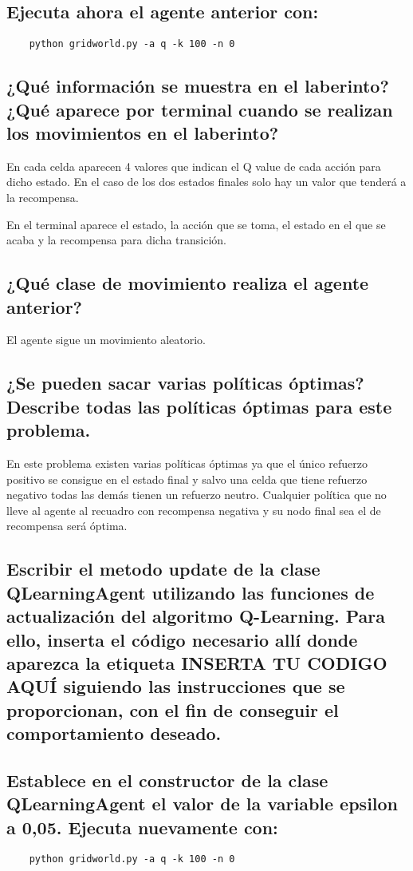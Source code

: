 \documentclass[12pt]{article}
\begin{document}
    \subsection{Ejecuta ahora el agente anterior con:}
    \begin{verbatim}
    python gridworld.py -a q -k 100 -n 0
    \end{verbatim}
    \subsection{¿Qué información se muestra en el laberinto? ¿Qué aparece por terminal cuando se realizan los
    movimientos en el laberinto?}
    En cada celda aparecen 4 valores que indican el Q value de cada acción para dicho estado. En el caso de los dos
    estados finales solo hay un valor que tenderá a la recompensa.

    En el terminal aparece el estado, la acción que se toma, el estado en el que se acaba y la recompensa para dicha
    transición.
    \subsection{¿Qué clase de movimiento realiza el agente anterior?}
    El agente sigue un movimiento aleatorio.
    \subsection{¿Se pueden sacar varias políticas óptimas? Describe todas las políticas óptimas para este problema.}
    En este problema existen varias políticas óptimas ya que el único refuerzo positivo se consigue en el estado
    final y salvo una celda que tiene refuerzo negativo todas las demás tienen un refuerzo neutro.
    Cualquier política que no lleve al agente al recuadro con recompensa negativa y su nodo final sea el de
    recompensa será óptima.
    \subsection{Escribir el metodo update de la clase QLearningAgent utilizando las funciones de actualización del algoritmo
    Q-Learning. Para ello, inserta el código necesario allí donde aparezca la etiqueta INSERTA TU CODIGO
    AQUÍ siguiendo las instrucciones que se proporcionan, con el fin de conseguir el comportamiento deseado.}
    \subsection{Establece en el constructor de la clase QLearningAgent el valor de la variable epsilon a 0,05.
    Ejecuta nuevamente con:}
    \begin{verbatim}
    python gridworld.py -a q -k 100 -n 0
    \end{verbatim}
\end{document}
